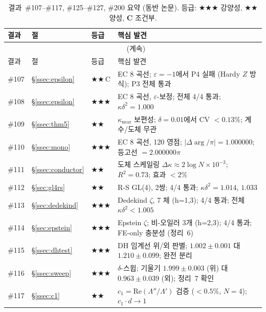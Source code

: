 \documentclass[11pt, a4paper]{article}
\theoremstyle{plain}
\theoremstyle{definition}
\begin{document}
\begin{longtable}{lllp{5.5cm}}
\caption{결과~\#107--\#117, \#125--\#127, \#200 요약 (동반 논문). 등급:
  \textbf{$\bigstar\bigstar\bigstar$} 강양성,
  \textbf{$\bigstar\bigstar$} 양성, \textbf{C} 조건부.}
\label{tab:summary}\\
\toprule
결과 & 절 & 등급 & 핵심 발견 \\
\midrule
\endfirsthead
\multicolumn{4}{c}{\tablename~\thetable{} (계속)}\\
\toprule
결과 & 절 & 등급 & 핵심 발견 \\
\midrule
\endhead
\bottomrule
\endfoot
\#107 & \S\ref{ssec:epsilon}      & \textbf{$\bigstar\bigstar$}\,C  & EC 8 곡선; $\varepsilon=-1$에서 P4 실패 (Hardy $Z$ 방식); P3 전체 통과 \\
\#108 & \S\ref{ssec:epsilon}      & \textbf{$\bigstar\bigstar\bigstar$}    & EC 8 곡선, $\varepsilon$-보정; 전체 4/4 통과; $\kappa\delta^{2}=1.000$ \\
\#109 & \S\ref{ssec:thm5}         & \textbf{$\bigstar\bigstar$}     & $\kappa_{\text{near}}$ 보편성; $\delta=0.01$에서 CV $<0.13\%$; 계수/도체 무관 \\
\#110 & \S\ref{ssec:mono}         & \textbf{$\bigstar\bigstar\bigstar$}    & EC 8 곡선, 120 영점; $|\Delta\!\arg/\pi|=1.000000$; 등고선 $=2.000000\pi$ \\
\#111 & \S\ref{ssec:conductor}    & \textbf{$\bigstar\bigstar$}     & 도체 스케일링 $\Delta\kappa\approx 2\log N\times 10^{-3}$; $R^{2}=0.73$; 효과 $<2\%$ \\
\#112 & \S\ref{sec:gl4rs}         & \textbf{$\bigstar\bigstar$}     & R-S GL(4), 2쌍; 4/4 통과; $\kappa\delta^{2}=1.014$, $1.033$ \\
\#113 & \S\ref{sec:dedekind}      & \textbf{$\bigstar\bigstar\bigstar$}    & Dedekind $\zeta$, 7 체 (h=1,3); 4/4 통과; 전체 $\kappa\delta^{2}<1.005$ \\
\#114 & \S\ref{sec:epstein}       & \textbf{$\bigstar\bigstar\bigstar$}    & Epstein $\zeta$; 비-오일러 3개 (h=2,3); 4/4 통과; FE-only 충분성 (정리~6) \\
\#115 & \S\ref{ssec:dhtest}       & \textbf{$\bigstar\bigstar\bigstar$}    & DH 임계선 위/외 판별; $1.002\pm0.001$ 대 $1.210\pm0.099$; 완전 분리 \\
\#116 & \S\ref{ssec:sweep}        & \textbf{$\bigstar\bigstar\bigstar$}    & $\delta$-스윕; 기울기 $1.999\pm0.003$ (위) 대 $0.963\pm0.039$ (외); 정리~7 확인 \\
\#117 & \S\ref{ssec:c1}           & \textbf{$\bigstar\bigstar$}     & $c_{1}=\mathrm{Re}(\Lambda''/\Lambda')$ 검증 ($<0.5\%$, $N=4$); $c_{1}\cdot d\to 1$ \\

\end{longtable}
\end{document}

